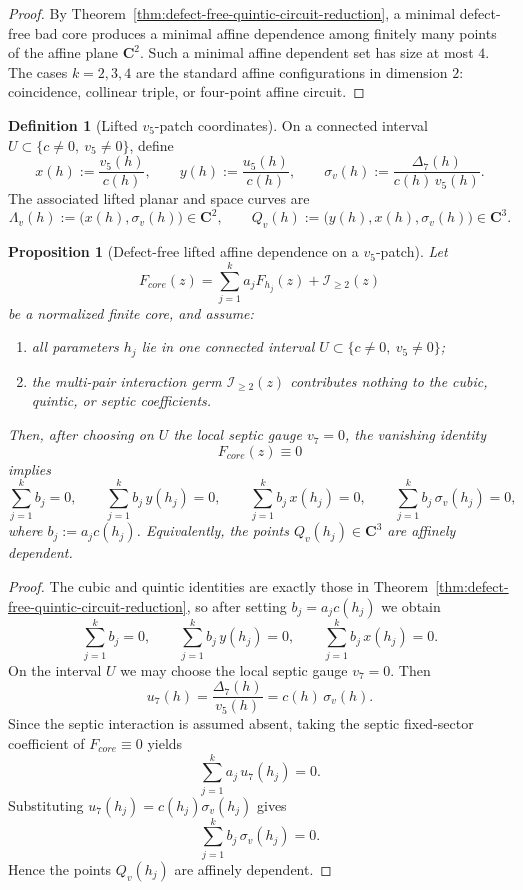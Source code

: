 \documentclass[11pt,a4paper]{amsart}
\def\core{core}%
\theoremstyle{plain}
\newtheorem{proposition}[theorem]{Proposition}
\theoremstyle{definition}
\newtheorem{definition}[theorem]{Definition}
\newcommand{\core}{\mathrm{core}}
\begin{document}
\begin{proof}
By Theorem~\ref{thm:defect-free-quintic-circuit-reduction}, a minimal
defect-free bad core produces a minimal affine dependence among finitely many
points of the affine plane $\mathbf C^2$. Such a minimal affine dependent
set has size at most $4$. The cases $k=2,3,4$ are the standard affine
configurations in dimension $2$: coincidence, collinear triple, or
four-point affine circuit.
\end{proof}

\begin{definition}[Lifted $v_5$-patch coordinates]
\label{def:lifted-v-patch-coordinates}
On a connected interval $U\subset\{c\neq 0,\ v_5\neq 0\}$, define
\[
x(h):=\frac{v_5(h)}{c(h)},
\qquad
y(h):=\frac{u_5(h)}{c(h)},
\qquad
\sigma_v(h):=\frac{\Delta_7(h)}{c(h)\,v_5(h)}.
\]
The associated lifted planar and space curves are
\[
\Lambda_v(h):=\bigl(x(h),\sigma_v(h)\bigr)\in\mathbf C^2,
\qquad
Q_v(h):=\bigl(y(h),x(h),\sigma_v(h)\bigr)\in\mathbf C^3.
\]
\end{definition}

\begin{proposition}[Defect-free lifted affine dependence on a $v_5$-patch]
\label{prop:defect-free-lifted-affine-dependence-vpatch}
Let
\[
F_{\core}(z)=\sum_{j=1}^k a_jF_{h_j}(z)+\mathcal I_{\ge 2}(z)
\]
be a normalized finite core, and assume:
\begin{enumerate}
\item all parameters $h_j$ lie in one connected interval
$U\subset\{c\neq 0,\ v_5\neq 0\}$;
\item the multi-pair interaction germ $\mathcal I_{\ge2}(z)$ contributes
nothing to the cubic, quintic, or septic coefficients.
\end{enumerate}
Then, after choosing on $U$ the local septic gauge $v_7=0$, the vanishing
identity
\[
F_{\core}(z)\equiv 0
\]
implies
\[
\sum_{j=1}^k b_j=0,
\qquad
\sum_{j=1}^k b_j\,y(h_j)=0,
\qquad
\sum_{j=1}^k b_j\,x(h_j)=0,
\qquad
\sum_{j=1}^k b_j\,\sigma_v(h_j)=0,
\]
where $b_j:=a_jc(h_j)$. Equivalently, the points $Q_v(h_j)\in\mathbf C^3$
are affinely dependent.
\end{proposition}

\begin{proof}
The cubic and quintic identities are exactly those in
Theorem~\ref{thm:defect-free-quintic-circuit-reduction}, so after setting
$b_j=a_jc(h_j)$ we obtain
\[
\sum_{j=1}^k b_j=0,
\qquad
\sum_{j=1}^k b_j\,y(h_j)=0,
\qquad
\sum_{j=1}^k b_j\,x(h_j)=0.
\]
On the interval $U$ we may choose the local septic gauge $v_7=0$. Then
\[
u_7(h)=\frac{\Delta_7(h)}{v_5(h)}=c(h)\,\sigma_v(h).
\]
Since the septic interaction is assumed absent, taking the septic fixed-sector
coefficient of $F_{\core}\equiv 0$ yields
\[
\sum_{j=1}^k a_j\,u_7(h_j)=0.
\]
Substituting $u_7(h_j)=c(h_j)\sigma_v(h_j)$ gives
\[
\sum_{j=1}^k b_j\,\sigma_v(h_j)=0.
\]
Hence the points $Q_v(h_j)$ are affinely dependent.
\end{proof}
\end{document}
